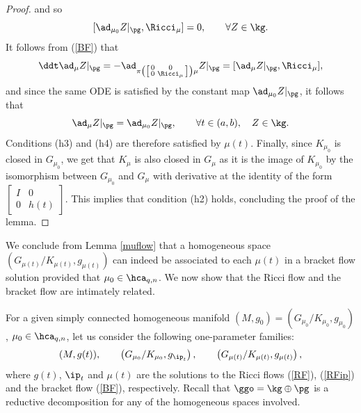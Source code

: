 \documentclass[11pt]{amsart}
\theoremstyle{plain}
\theoremstyle{definition}
\theoremstyle{remark}
\begin{document}
\begin{proof}
and so
\begin{equation}\label{muk2}
[\ad_{\mu_0}{Z}|_{\pg},\Ricci_{\mu}]= 0,\qquad\forall Z\in\kg.
\end{equation}
It follows from (\ref{BF}) that
$$
\ddt\ad_{\mu}{Z}|_{\pg}= -\ad_{\pi\left(\left[\begin{smallmatrix} 0&0\\ 0&\Ricci_{\mu}
\end{smallmatrix}\right]\right)\mu}{Z}|_{\pg}= [\ad_{\mu}{Z}|_{\pg},\Ricci_{\mu}],
$$
and since the same ODE is satisfied by the constant map $\ad_{\mu_0}{Z}|_{\pg}$, it follows that
\begin{equation}\label{admuz}
\ad_{\mu}{Z}|_{\pg}=\ad_{\mu_0}{Z}|_{\pg}, \qquad\forall t\in (a,b), \quad Z\in\kg.
\end{equation}
Conditions (h3) and (h4) are therefore satisfied by $\mu(t)$.  Finally, since $K_{\mu_0}$ is closed in $G_{\mu_0}$, we get that $K_{\mu}$ is also closed in $G_{\mu}$ as it is the image of $K_{\mu_0}$ by the isomorphism between $G_{\mu_0}$ and $G_{\mu}$ with derivative at the identity of the form $\left[\begin{smallmatrix} I&0\\ 0&h(t)
\end{smallmatrix}\right]$.  This implies that condition (h2) holds, concluding the proof of the lemma.
\end{proof}


We conclude from Lemma \ref{muflow} that a homogeneous space $(G_{\mu(t)}/K_{\mu(t)},g_{\mu(t)})$ can indeed
be associated to each $\mu(t)$ in a bracket flow solution provided that $\mu_0\in\hca_{q,n}$.  We now show that the Ricci flow and the bracket flow are intimately related.

For a given simply connected homogeneous manifold $(M,g_0)=\left(G_{\mu_0}/K_{\mu_0},g_{\mu_0}\right)$, $\mu_0\in\hca_{q,n}$, let us consider the following one-parameter families:
\begin{equation}\label{3rm}
(M,g(t)), \qquad \left(G_{\mu_0}/K_{\mu_0},g_{\ip_t}\right), \qquad \left(G_{\mu(t)}/K_{\mu(t)},g_{\mu(t)}\right),
\end{equation}
where $g(t)$, $\ip_t$ and $\mu(t)$ are the solutions to the Ricci flows (\ref{RF}), (\ref{RFip}) and the bracket flow (\ref{BF}), respectively.  Recall that $\ggo=\kg\oplus\pg$ is a reductive decomposition for any of the homogeneous spaces involved.
\end{document}
